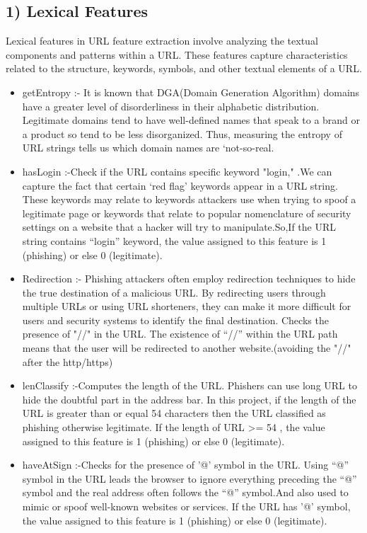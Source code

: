 \documentclass[conference]{IEEEtran}
\begin{document}
\subsection*{1) Lexical Features}
\par Lexical features in URL feature extraction involve analyzing the textual components and patterns within a URL. These features capture characteristics related to the structure, keywords, symbols, and other textual elements of a URL.
\begin{itemize}
  \item getEntropy :-{ It is known that DGA(Domain Generation Algorithm) domains have a greater level of disorderliness in their alphabetic distribution. Legitimate domains tend to have well-defined names that speak to a brand or a product so tend to be less disorganized. Thus, measuring the entropy of URL strings tells us which domain names are ‘not-so-real.}
  \item hasLogin :-{Check if the URL contains specific keyword "login," .We can capture the fact that certain ‘red flag’ keywords appear in a URL string. These keywords may relate to keywords attackers use when trying to spoof a legitimate page or keywords that relate to popular nomenclature of security settings on a website that a hacker will try to manipulate.So,If the URL string contains “login” keyword, the value assigned to this feature is 1 (phishing) or else 0 (legitimate).}
  \item Redirection :-{ Phishing attackers often employ redirection techniques to hide the true destination of a malicious URL. By redirecting users through multiple URLs or using URL shorteners, they can make it more difficult for users and security systems to identify the final destination. Checks the presence of "//" in the URL. The existence of “//” within the URL path means that the user will be redirected to another website.(avoiding the "//" after the http/https)}
  \item lenClassify :-{Computes the length of the URL. Phishers can use long URL to hide the doubtful part in the address bar. In this project, if the length of the URL is greater than or equal 54 characters then the URL classified as phishing otherwise legitimate. If the length of URL >= 54 , the value assigned to this feature is 1 (phishing) or else 0 (legitimate).}
  \item haveAtSign :-{Checks for the presence of '@' symbol in the URL. Using “@” symbol in the URL leads the browser to ignore everything preceding the “@” symbol and the real address often follows the “@” symbol.And also used to mimic or spoof well-known websites or services. If the URL has '@' symbol, the value assigned to this feature is 1 (phishing) or else 0 (legitimate).}

\end{itemize}
\end{document}
